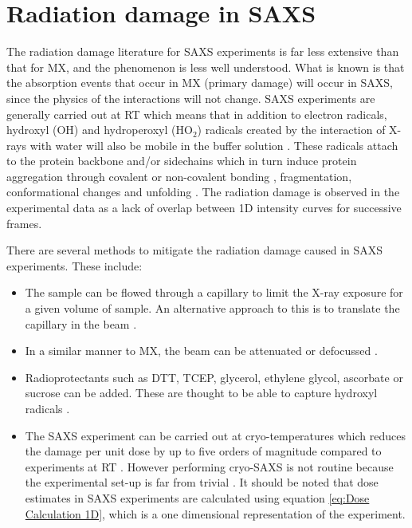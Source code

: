 \section{Radiation damage in SAXS}
\label{sec:Radiation damage in SAXS}
    The radiation damage literature for SAXS experiments is far less extensive than that for MX, and the phenomenon is less well understood.
    What is known is that the absorption events that occur in MX (primary damage) will occur in SAXS, since the physics of the interactions will not change.
    SAXS experiments are generally carried out at RT which means that in addition to electron radicals, hydroxyl (OH) and hydroperoxyl (HO$_{\text{2}}$) radicals created by the interaction of X-rays with water will also be mobile in the buffer solution \cite{jeffries2015limiting,garrison1987reaction}.
    These radicals attach to the protein backbone and/or sidechains which in turn induce protein aggregation through covalent or non-covalent bonding \cite{kuwamoto2004radiation}, fragmentation, conformational changes and unfolding \cite{hopkins2016quantifying}.
    The radiation damage is observed in the experimental data as a lack of overlap between 1D intensity curves for successive frames.

    There are several methods to mitigate the radiation damage caused in SAXS experiments. These include:
    \begin{itemize}
        \item The sample can be flowed through a capillary to limit the X-ray exposure for a given volume of sample.
        An alternative approach to this is to translate the capillary in the beam \cite{jeffries2015limiting}.
        \item In a similar manner to MX, the beam can be attenuated or defocussed \cite{jeffries2015limiting}.
        \item Radioprotectants such as DTT, TCEP, glycerol, ethylene glycol, ascorbate or sucrose can be added.
        These are thought to be able to capture hydroxyl radicals \cite{grishaev2012sample}.
        \item The SAXS experiment can be carried out at cryo-temperatures which reduces the damage per unit dose by up to five orders of magnitude compared to experiments at RT \cite{meisburger2013breaking}.
        However performing cryo-SAXS is not routine because the experimental set-up is far from trivial \cite{jeffries2015limiting}.
        It should be noted that dose estimates in SAXS experiments are calculated using equation \ref{eq:Dose Calculation 1D}, which is a one dimensional representation of the experiment.
    \end{itemize}

